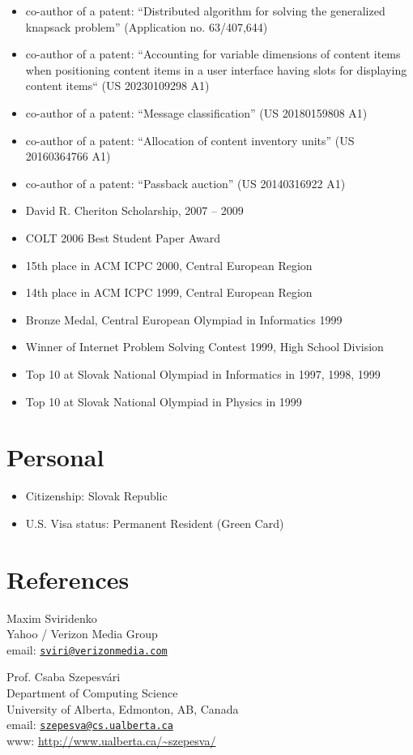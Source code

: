 \documentclass[9pt]{article}
\begin{document}
\begin{itemize}
\item co-author of a patent: ``Distributed algorithm for solving the generalized knapsack problem'' (Application no. 63/407,644)
\item co-author of a patent: ``Accounting for variable dimensions of content items when positioning content items in a user interface having slots for displaying content items`` (US 20230109298 A1)
\item co-author of a patent: ``Message classification'' (US 20180159808 A1)
\item co-author of a patent: ``Allocation of content inventory units'' (US 20160364766 A1)
\item co-author of a patent: ``Passback auction'' (US 20140316922 A1)
\item David R. Cheriton Scholarship, 2007 -- 2009
\item COLT 2006 Best Student Paper Award
\item 15th place in ACM ICPC 2000, Central European Region
\item 14th place in ACM ICPC 1999, Central European Region
\item Bronze Medal, Central European Olympiad in Informatics 1999
\item Winner of Internet Problem Solving Contest 1999, High School Division
\item Top 10 at Slovak National Olympiad in Informatics in 1997, 1998, 1999
\item Top 10 at Slovak National Olympiad in Physics in 1999
\end{itemize}

\section*{Personal}

\begin{itemize}
\item Citizenship: Slovak Republic
\item U.S. Visa status: Permanent Resident (Green Card)
\end{itemize}

\section*{References}
%
\begin{minipage}[t]{9cm}
Maxim Sviridenko \\
Yahoo / Verizon Media Group \\
email: \href{mailto:sviri@verizonmedia.com}{\texttt{sviri@verizonmedia.com}} \\
\end{minipage}
%
\begin{minipage}[t]{9cm}
Prof. Csaba Szepesv\'ari \\
Department of Computing Science \\
University of Alberta, Edmonton, AB, Canada \\
email: \href{mailto:szepesva@cs.ualberta.ca}{\texttt{szepesva@cs.ualberta.ca}} \\
www: \url{http://www.ualberta.ca/~szepesva/}
\end{minipage}
\end{document}
